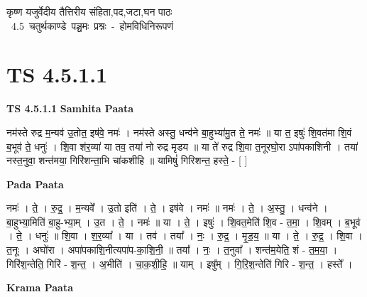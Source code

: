 \documentclass[17pt]{extarticle}
\begin{document}
\begin{titlepage}
    \begin{center}
 
\begin{sanskrit}
    { \Large
    कृष्ण यजुर्वेदीय तैत्तिरीय संहिता,पद,जटा,घन पाठः 
    }
    \\
    \vspace{2.5cm}
    \mbox{ \Large
    4.5      चतुर्थकाण्डे पञ्चमः प्रश्नः - होमविधिनिरूपणं   }
\end{sanskrit}
\end{center}

\end{titlepage}
\tableofcontents
{}
\pagebreak


\section{ TS 4.5.1.1 }

\textbf{TS 4.5.1.1 } \newline
\textbf{Samhita Paata} \newline

नम॑स्ते रुद्र म॒न्यव॑ उ॒तोत॒ इष॑वे॒ नमः॑ । नम॑स्ते अस्तु॒ धन्व॑ने बा॒हुभ्या॑मु॒त ते॒ नमः॑ ॥                                   या त॒ इषुः॑ शि॒वत॑मा शि॒वं ब॒भूव॑ ते॒ धनुः॑ । शि॒वा श॑र॒व्या॑ या तव॒ तया॑ नो रुद्र मृडय ॥     या ते॑ रुद्र शि॒वा त॒नूरघो॒रा ऽपा॑पकाशिनी । तया॑ नस्त॒नुवा॒ शन्त॑मया॒ गिरि॑शन्ता॒भि चा॑कशीहि ॥                                यामिषुं॑ गिरिशन्त॒ हस्ते॒ - [  ] \newline

\textbf{Pada Paata} \newline

नमः॑ । ते॒ । रु॒द्र॒ । म॒न्यवे᳚ । उ॒तो इति॑ । ते॒ । इष॑वे । नमः॑ ॥ नमः॑ । ते॒ । अ॒स्तु॒ । धन्व॑ने । बा॒हुभ्या॒मिति॑ बा॒हु-भ्या॒म् । उ॒त । ते॒ । नमः॑ ॥ या । ते॒ । इषुः॑ । शि॒वत॒मेति॑ शि॒व - त॒मा॒ । शि॒वम् । ब॒भूव॑ । ते॒ । धनुः॑ ॥ शि॒वा । श॒र॒व्या᳚ । या । तव॑ । तया᳚ । नः॒ । रु॒द्र॒ । मृ॒ड॒य॒ ॥ या । ते॒ । रु॒द्र॒ । शि॒वा । त॒नूः । अघो॑रा । अपा॑पकाशि॒नीत्यपा॑प-का॒शि॒नी॒ ॥ तया᳚ । नः॒ । त॒नुवा᳚ । शन्त॑म॒येति॒ शं - त॒म॒या॒ । गिरि॑श॒न्तेति॒ गिरि॑ - श॒न्त॒ । अ॒भीति॑ । चा॒क॒शी॒हि॒ ॥ याम् । इषु᳚म् । गि॒रि॒श॒न्तेति॑ गिरि - श॒न्त॒ । हस्ते᳚ ।  \newline


\textbf{Krama Paata} \newline
\end{document}
